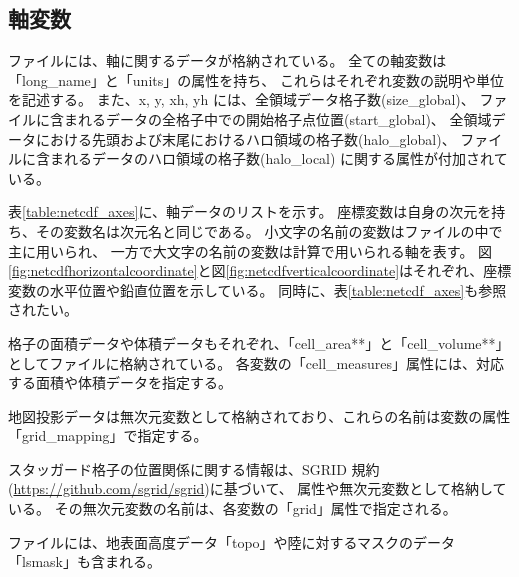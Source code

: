 \subsection{軸変数}
\scalenetcdf ファイルには、軸に関するデータが格納されている。
全ての軸変数は「long\_name」と「units」の属性を持ち、
これらはそれぞれ変数の説明や単位を記述する。
また、x, y, xh, yh には、全領域データ格子数(size\_global)、
ファイルに含まれるデータの全格子中での開始格子点位置(start\_global)、
全領域データにおける先頭および末尾におけるハロ領域の格子数(halo\_global)、
ファイルに含まれるデータのハロ領域の格子数(halo\_local) に関する属性が付加されている。

表\ref{table:netcdf_axes}に、軸データのリストを示す。
座標変数は自身の次元を持ち、その変数名は次元名と同じである。
小文字の名前の変数はファイルの中で主に用いられ、
一方で大文字の名前の変数は計算で用いられる軸を表す。
図\ref{fig:netcdfhorizontalcoordinate}と図\ref{fig:netcdfverticalcoordinate}はそれぞれ、座標変数の水平位置や鉛直位置を示している。
同時に、表\ref{table:netcdf_axes}も参照されたい。

格子の面積データや体積データもそれぞれ、「cell\_area**」と「cell\_volume**」としてファイルに格納されている。
各変数の「cell\_measures」属性には、対応する面積や体積データを指定する。

地図投影データは無次元変数として格納されており、これらの名前は変数の属性「grid\_mapping」で指定する。

スタッガード格子の位置関係に関する情報は、SGRID 規約(\url{https://github.com/sgrid/sgrid})に基づいて、
属性や無次元変数として格納している。
その無次元変数の名前は、各変数の「grid」属性で指定される。

ファイルには、地表面高度データ「topo」や陸に対するマスクのデータ「lsmask」も含まれる。


